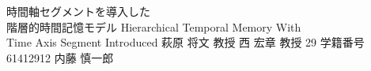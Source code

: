 \documentclass[final,a4j,12pt]{jreport}
\begin{document}
\begin{titlepage}
\thesis
{時間軸セグメントを導入した \\ 階層的時間記憶モデル}
{Hierarchical Temporal Memory With \\ Time Axis Segment Introduced}
{萩原 将文 教授}
{西 宏章 教授}
{29}
{学籍番号 61412912}
{内藤 慎一郎}
\end{titlepage}

\contents










\printbibliography[title=参考文献]

\appendix


% 
% 
\end{document}

